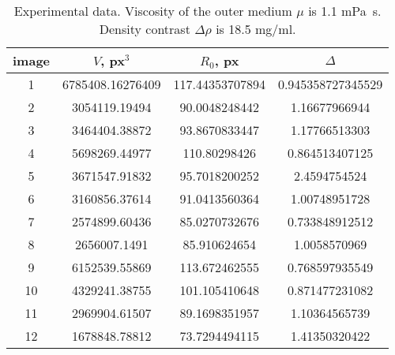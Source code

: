 \begin{table}
\centering
\begin{tabular}{|c|c|c|c|}
\hline
image & $V$, px$^3$ & $R_0$, px & $\Delta$\\ 
\hline
1 & 6785408.16276409 & 117.44353707894 & 0.945358727345529\\ 
\hline
2 & 3054119.19494 & 90.0048248442 & 1.16677966944\\ 
\hline
3 & 3464404.38872 & 93.8670833447 & 1.17766513303\\ 
\hline
4 & 5698269.44977 & 110.80298426 & 0.864513407125\\ 
\hline
5 & 3671547.91832 & 95.7018200252 & 2.4594754524\\ 
\hline
6 & 3160856.37614 & 91.0413560364 & 1.00748951728\\ 
\hline
7 & 2574899.60436 & 85.0270732676 & 0.733848912512\\ 
\hline
8 & 2656007.1491 & 85.910624654 & 1.0058570969\\ 
\hline
9 & 6152539.55869 & 113.672462555 & 0.768597935549\\ 
\hline
10 & 4329241.38755 & 101.105410648 & 0.871477231082\\ 
\hline
11 & 2969904.61507 & 89.1698351957 & 1.10364565739\\ 
\hline
12 & 1678848.78812 & 73.7294494115 & 1.41350320422\\ 
\hline\end{tabular}
\caption{\small{Experimental data. Viscosity of the outer medium $\mu$ is 1.1 mPa~s. Density contrast $\Delta\rho$ is 18.5 mg/ml.}}
\label{tab:experiment} 
\end{table}